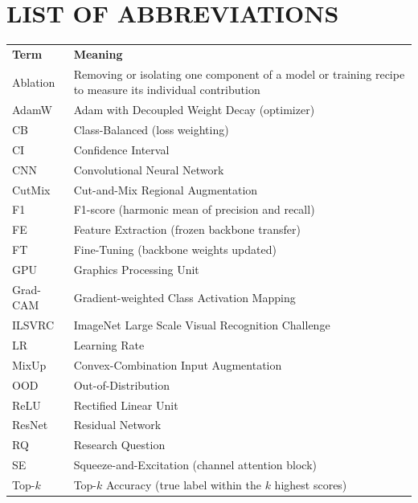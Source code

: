 \documentclass[12pt,a4paper]{article}
\begin{document}
\section*{LIST OF ABBREVIATIONS}
\vspace{0.5cm}
\begin{tabular}{@{}p{3.2cm}p{10.5cm}@{}}
    \textbf{Term} & \textbf{Meaning} \\[0.3em]
    Ablation & Removing or isolating one component of a model or training recipe to measure its individual contribution \\
    AdamW    & Adam with Decoupled Weight Decay (optimizer) \\
    CB       & Class-Balanced (loss weighting) \\
    CI       & Confidence Interval \\
    CNN      & Convolutional Neural Network \\
    CutMix   & Cut-and-Mix Regional Augmentation \\
    F1       & F1-score (harmonic mean of precision and recall) \\
    FE       & Feature Extraction (frozen backbone transfer) \\
    FT       & Fine-Tuning (backbone weights updated) \\
    GPU      & Graphics Processing Unit \\
    Grad-CAM & Gradient-weighted Class Activation Mapping \\
    ILSVRC   & ImageNet Large Scale Visual Recognition Challenge \\
    LR       & Learning Rate \\
    MixUp    & Convex-Combination Input Augmentation \\
    OOD      & Out-of-Distribution \\
    ReLU     & Rectified Linear Unit \\
    ResNet   & Residual Network \\
    RQ       & Research Question \\
    SE       & Squeeze-and-Excitation (channel attention block) \\
    Top-$k$  & Top-$k$ Accuracy (true label within the $k$ highest scores) \\
\end{tabular}
\clearpage

\renewcommand{\listtablename}{LIST OF TABLES}
\listoftables
\vspace{1.5em}
\end{document}
